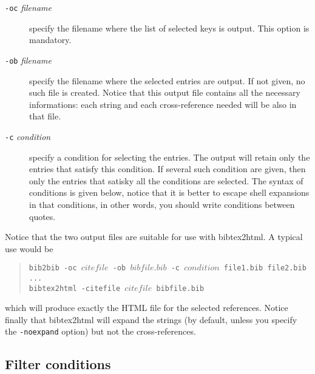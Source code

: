 \documentclass[11pt,a4paper]{article}
\begin{document}
\begin{description}
  
\item[\texttt{-oc} \textit{filename}]
  specify the filename where the list of selected keys is output. This
  option is mandatory.

\item[\texttt{-ob} \textit{filename}]
  specify the filename where the selected entries are output. If not
  given, no such file is created. Notice that this output file
  contains all the necessary informations: each string and each
  cross-reference needed will be also in that file.

\item[\texttt{-c} \textit{condition}]
  specify a condition for selecting the entries. The output will
  retain only the entries that satisfy this condition. If several such
  condition are given, then only the entries that satisky all the
  conditions are selected. The syntax of conditions is given below,
  notice that it is better to escape shell expansions in that
  conditions, in other words, you should write conditions between
  quotes. 

\end{description}

Notice that the two output files are suitable for use with
bibtex2html.  A typical use would be
\begin{quote}
\texttt{bib2bib -oc $citefile$ -ob $bibfile.bib$ -c $condition$
  file1.bib file2.bib ... } \\
\texttt{bibtex2html -citefile $citefile$ bibfile.bib}
\end{quote}
which will produce exactly the HTML file for the selected
references. Notice finally that bibtex2html will expand the strings
(by default, unless you specify the \verb|-noexpand| option) but not
the cross-references.

\subsection{Filter conditions}
\end{document}
